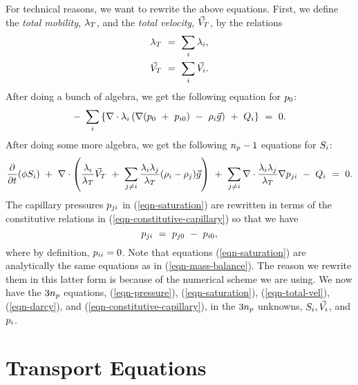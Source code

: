 For technical reasons, we want to rewrite the above equations.
First, we define the {\em total mobility}, ${\lambda}_T$,
and the {\em total velocity}, ${\vec V}_T$, by the relations
\begin{eqnarray}
{\lambda}_T ~=~ \sum_{i} {\lambda}_i , \label{eqn-total-mob} \\
{\vec V}_T ~=~ \sum_{i} {\vec V}_i .     \label{eqn-total-vel}
\end{eqnarray}
After doing a bunch of algebra, we get the following equation
for $p_0$:
\begin{equation} \label{eqn-pressure}
-~ \sum_{i}
  \left \{
    \nabla \cdot {\lambda}_i
      \left ( \nabla ( p_0 ~+~ p_{i0} ) ~-~ \rho_i {\vec g} \right )
    ~+~
    Q_i
  \right \}
~=~ 0 .
\end{equation}
After doing some more algebra, we get the following $n_p - 1$
equations for $S_i$:
\begin{equation} \label{eqn-saturation}
\frac{\partial}{\partial t} ( \phi S_i )
~+~
\nabla \cdot
  \left (
     \frac{{\lambda}_i}{{\lambda}_T} {\vec V}_T ~+~
     \sum_{j \neq i} \frac{{\lambda}_i {\lambda}_j}{{\lambda}_T} ( \rho_i - \rho_j ) {\vec g}
  \right )
~+~
\sum_{j \neq i} \nabla \cdot
    \frac{{\lambda}_i {\lambda}_j}{{\lambda}_T} \nabla p_{ji}
~-~ Q_i
~=~ 0 .
\end{equation}
The capillary pressures $p_{ji}$ in (\ref{eqn-saturation}) are
rewritten in terms of the constitutive relations in
(\ref{eqn-constitutive-capillary}) so that we have
\begin{equation} \label{eqn-derived-capillary}
p_{ji} ~=~ p_{j0} ~-~ p_{i0} ,
\end{equation}
where by definition, $p_{ii} = 0$.
Note that equations (\ref{eqn-saturation}) are analytically the
same equations as in (\ref{eqn-mass-balance}).
The reason we rewrite them in this latter form is because
of the numerical scheme we are using.
We now have the $3 n_p$ equations,
(\ref{eqn-pressure}), (\ref{eqn-saturation}),
(\ref{eqn-total-vel}), (\ref{eqn-darcy}), and
(\ref{eqn-constitutive-capillary}),
in the $3 n_p$ unknowns,
$S_i, {\vec V}_i$, and $p_i$.


\section{Transport Equations}
\label{Transport Equations}

